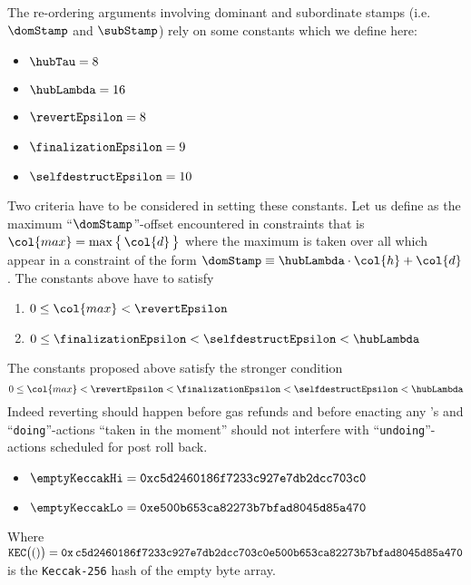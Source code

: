 The re-ordering arguments involving dominant and subordinate stamps (i.e. $\domStamp$ and $\subStamp$) rely on some constants which we define here:
\begin{itemize}
	\item $\hubTau              =  8$
	\item $\hubLambda           = 16$
	\item $\revertEpsilon       =  8$
	\item $\finalizationEpsilon =  9$
	\item $\selfdestructEpsilon = 10$
\end{itemize}
Two criteria have to be considered in setting these constants.
Let us define  as the maximum ``$\domStamp$''-offset encountered in constraints
that is
$\col{max} = \max \big\{ \, \col{d} \, \big \}$
where the maximum is taken over all  which appear in a constraint of the form $\domStamp \equiv \hubLambda \cdot \col{h} + \col{d}$.
The constants above have to satisfy
\begin{enumerate}
	\item $0 \leq \col{max} < \revertEpsilon$
	\item $0 \leq \finalizationEpsilon < \selfdestructEpsilon < \hubLambda$
\end{enumerate}
The constants proposed above satisfy the stronger condition
\[
	0 \leq \col{max} < \revertEpsilon < \finalizationEpsilon < \selfdestructEpsilon < \hubLambda
\]
Indeed reverting should happen before gas refunds and before enacting any 's and ``\texttt{doing}''-actions ``taken in the moment'' should not interfere with ``\texttt{undoing}''-actions scheduled for post roll back.
\begin{itemize}
	\item $\emptyKeccakHi = \texttt{0xc5d2460186f7233c927e7db2dcc703c0}$
	\item $\emptyKeccakLo = \texttt{0xe500b653ca82273b7bfad8045d85a470}$
\end{itemize}
Where $\texttt{KEC}\big(()\big) = \texttt{0x\,c5d2460186f7233c927e7db2dcc703c0e500b653ca82273b7bfad8045d85a470}$ is the \texttt{Keccak-256} hash of the empty byte array.
